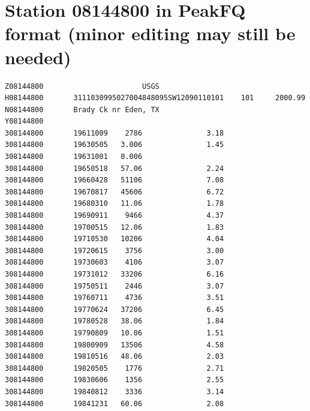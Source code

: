 \documentclass[12pt]{article}
\begin{document}
\clearpage
\section*{\small{Station 08144800 in PeakFQ format (minor editing may still be needed)}}
\begin{verbatim}
Z08144800                       USGS 
H08144800       3111030995027004848095SW12090110101    101     2000.99          
N08144800       Brady Ck nr Eden, TX
Y08144800       
308144800       19611009    2786               3.18                      
308144800       19630505   3.006               1.45                      
308144800       19631001   0.006                                         
308144800       19650518   57.06               2.24                      
308144800       19660428   51106               7.08                      
308144800       19670817   45606               6.72                      
308144800       19680310   11.06               1.78                      
308144800       19690911    9466               4.37                      
308144800       19700515   12.06               1.83                      
308144800       19710530   10206               4.04                      
308144800       19720615    3756               3.00                      
308144800       19730603    4106               3.07                      
308144800       19731012   33206               6.16                      
308144800       19750511    2446               3.07                      
308144800       19760711    4736               3.51                      
308144800       19770624   37206               6.45                      
308144800       19780528   38.06               1.84                      
308144800       19790809   10.06               1.51                      
308144800       19800909   13506               4.58                      
308144800       19810516   48.06               2.03                      
308144800       19820505    1776               2.71                      
308144800       19830606    1356               2.55                      
308144800       19840812    3336               3.14                      
308144800       19841231   60.06               2.08  
\end{verbatim}
\end{document}
